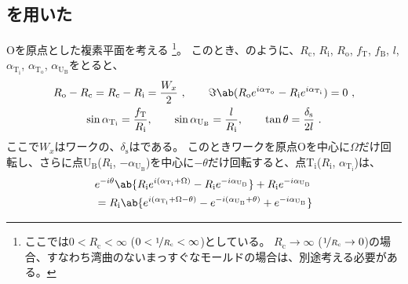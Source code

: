 \subsection{\Spacer を用いた\ReAlocation}
\CurvatureCenter{}Oを原点とした複素平面を考える
\footnote{ここでは$0 < R_\mathrm c < \infty$ ($0 < \nicefrac1{R_\mathrm c} < \infty$)としている。
$R_\mathrm c \to \infty$ ($\nicefrac1{R_\mathrm c} \to 0$)の場合、すなわち湾曲のないまっすぐなモールドの場合は、別途考える必要がある。}。
このとき、のように、$R_\mathrm c$, $R_\mathrm i$, $R_\mathrm o$, $f_\mathrm T$, $f_\mathrm B$, $l$, $\alpha_{\mathrm T_\mathrm i}$, $\alpha_{\mathrm T_\mathrm o}$, $\alpha_{\mathrm U_\mathrm B}$をとると、
\begin{subequations}
\begin{gather}
  \label{eq:constraintUpoint1}
  R_\mathrm o - R_\mathrm c = R_\mathrm c - R_\mathrm i = \frac{W_x}2~, \qquad
  \Im\ab(R_\mathrm oe^{i\alpha_{\mathrm T_\mathrm o}} - R_\mathrm ie^{i\alpha_{\mathrm T_\mathrm i}})
  = 0~,\\
  \label{eq:constraintUpoint2}
  \sin\alpha_{\mathrm T_\mathrm i} = \frac{f_\mathrm T}{R_\mathrm i}, \qquad
  \sin\alpha_{\mathrm U_\mathrm B} = \frac l{R_\mathrm i}, \qquad
  \tan\theta = \frac{\delta_\mathrm s}{2l}~.
\end{gather}
\end{subequations}
ここで$W_x$はワークの\ACOD、$\delta_\mathrm s$は\textbf{\SpacerThickness}である。
このときワークを原点Oを中心に$\Omega$だけ回転し、さらに点U$_\mathrm B$($R_\mathrm i$, $-\alpha_{\mathrm U_\mathrm B}$)を中心に$-\theta$だけ回転すると、点T$_\mathrm i$($R_\mathrm i$, $\alpha_{\mathrm T_\mathrm i}$)は、
\begin{align}
  \notag
  & e^{-i\theta}\ab\{R_\mathrm ie^{i(\alpha_{\mathrm T_\mathrm i} + \Omega)} - R_\mathrm ie^{-i\alpha_{\mathrm U_\mathrm B}}\}
    +R_\mathrm ie^{-i\alpha_{\mathrm U_\mathrm B}}\\
  &= R_\mathrm i
     \ab\{
       e^{i(\alpha_{\mathrm T_\mathrm i} + \Omega - \theta)} - e^{-i(\alpha_{\mathrm U_\mathrm B} + \theta)} + e^{-i\alpha_{\mathrm U_\mathrm B}}
     \}
  \label{eq:afterftUpoint}
\end{align}
